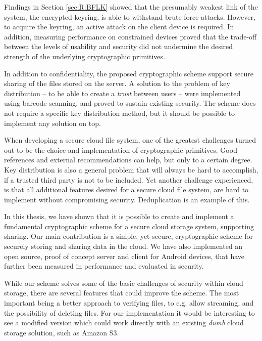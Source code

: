\documentclass[pdftex,english,10pt,b5paper,twoside]{book}
\begin{document}
Findings in Section \ref{sec:R:BFLK} showed that the presumably weakest link of
the system, the encrypted keyring, is able to withstand brute force attacks.
However, to acquire the keyring, an active attack on the client device is
required. In addition, measuring performance on constrained devices proved that
the trade-off between the levels of usability and security did not undermine
the desired strength of the underlying cryptographic primitives.

In addition to confidentiality, the proposed cryptographic scheme support
secure sharing of the files stored on the server. A solution to the problem of
key distribution -- to be able to create a \emph{trust} between users -- were
implemented using barcode scanning, and proved to sustain existing security.
The scheme does not require a specific key distribution method, but it should
be possible to implement any solution on top.

When developing a secure cloud file system, one of the greatest challenges
turned out to be the choice and implementation of cryptographic primitives.
Good references and external recommendations can help, but only to a certain
degree. Key distribution is also a general problem that will always be hard to
accomplish, if a trusted third party is not to be included. Yet another
challenge experienced, is that all additional features desired for a secure
cloud file system, are hard to implement without compromising security.
Deduplication is an example of this.

In this thesis, we have shown that it is possible to create and implement a
fundamental cryptographic scheme for a secure cloud storage system, supporting
sharing. Our main contribution is a simple, yet secure, cryptographic scheme
for securely storing and sharing data in the cloud. We have also implemented an
open source, proof of concept server and client for Android devices, that have
further been measured in performance and evaluated in security.

While our scheme solves some of the basic challenges of security within cloud
storage, there are several features that could improve the scheme. The most
important being a better approach to verifying files, to e.g. allow streaming,
and the possibility of deleting files. For our implementation it would be
interesting to see a modified version which could work directly with
an existing \emph{dumb} cloud storage solution, such as Amazon S3.
\end{document}
